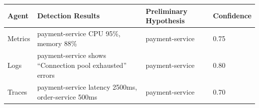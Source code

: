 \begin{longtable}[]{@{}llll@{}}
\toprule
\begin{minipage}[b]{0.10\columnwidth}\raggedright
Agent\strut
\end{minipage} & \begin{minipage}[b]{0.27\columnwidth}\raggedright
Detection Results\strut
\end{minipage} & \begin{minipage}[b]{0.34\columnwidth}\raggedright
Preliminary Hypothesis\strut
\end{minipage} & \begin{minipage}[b]{0.17\columnwidth}\raggedright
Confidence\strut
\end{minipage}\tabularnewline
\midrule
\endhead
\begin{minipage}[t]{0.10\columnwidth}\raggedright
Metrics\strut
\end{minipage} & \begin{minipage}[t]{0.27\columnwidth}\raggedright
payment-service CPU 95\%, memory 88\%\strut
\end{minipage} & \begin{minipage}[t]{0.34\columnwidth}\raggedright
payment-service\strut
\end{minipage} & \begin{minipage}[t]{0.17\columnwidth}\raggedright
0.75\strut
\end{minipage}\tabularnewline
\begin{minipage}[t]{0.10\columnwidth}\raggedright
Logs\strut
\end{minipage} & \begin{minipage}[t]{0.27\columnwidth}\raggedright
payment-service shows ``Connection pool exhausted'' errors\strut
\end{minipage} & \begin{minipage}[t]{0.34\columnwidth}\raggedright
payment-service\strut
\end{minipage} & \begin{minipage}[t]{0.17\columnwidth}\raggedright
0.80\strut
\end{minipage}\tabularnewline
\begin{minipage}[t]{0.10\columnwidth}\raggedright
Traces\strut
\end{minipage} & \begin{minipage}[t]{0.27\columnwidth}\raggedright
payment-service latency 2500ms, order-service 500ms\strut
\end{minipage} & \begin{minipage}[t]{0.34\columnwidth}\raggedright
payment-service\strut
\end{minipage} & \begin{minipage}[t]{0.17\columnwidth}\raggedright
0.70\strut
\end{minipage}\tabularnewline
\bottomrule
\end{longtable}

